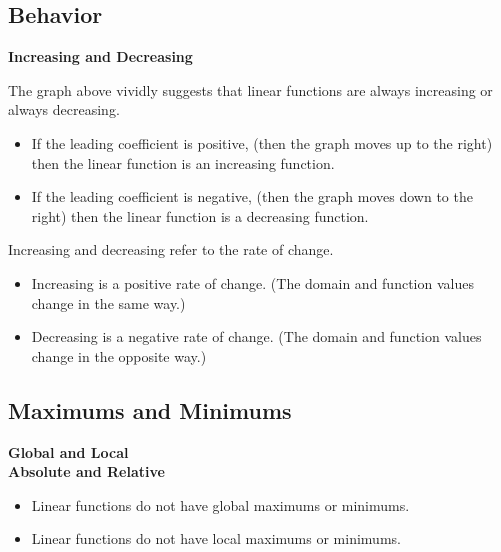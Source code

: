 \documentclass{ximera}
\begin{document}
\subsection*{Behavior}



\textbf{\textcolor{blue!55!black}{Increasing and Decreasing}}






The graph above vividly suggests that linear functions are always increasing or always decreasing.


\begin{itemize}
\item If the leading coefficient is positive, (then the graph moves up to the right) then the linear function is an increasing function.

\item If the leading coefficient is negative, (then the graph moves down to the right) then the linear function is a decreasing function.
\end{itemize}





Increasing and decreasing refer to the rate of change.


\begin{itemize}
\item Increasing is a positive rate of change. (The domain and function values change in the same way.)
\item Decreasing is a negative rate of change. (The domain and function values change in the opposite way.)
\end{itemize}
















\subsection*{Maximums and Minimums}

\textbf{\textcolor{blue!55!black}{Global and Local}} \\
\textbf{\textcolor{blue!55!black}{Absolute and Relative}} \\


\begin{itemize}
     \item Linear functions do not have global maximums or minimums. 
     \item Linear functions do not have local maximums or minimums. 
\end{itemize}
\end{document}

